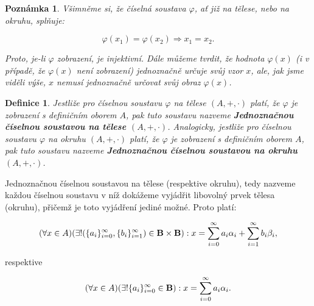 \documentclass[12pt]{book}
\newtheorem{definice}{Definice}
\newtheorem{pozn}{Poznámka}
\begin{document}
\begin{pozn}
	Všimněme si, že číselná soustava $\varphi$, ať již na tělese, nebo na okruhu, splňuje:
	
	$$\varphi (x_1) = \varphi(x_2) \Rightarrow x_1 = x_2.$$
	
	Proto, je-li $\varphi$ zobrazení, je injektivní.
	Dále můžeme tvrdit, že hodnota $\varphi(x)$ (i v případě, že $\varphi(x)$ není zobrazení) jednoznačně určuje svůj vzor $x$, ale, jak jsme viděli výše, $x$ nemusí jednoznačně určovat svůj obraz $\varphi(x)$.
	
\end{pozn}

\begin{definice}
	Jestliže pro číselnou soustavu $\varphi$ na tělese $(A,+,\cdot)$ platí, že $\varphi$ je zobrazení s definičním oborem $A$, pak tuto soustavu nazveme \textbf{Jednoznačnou číselnou soustavou na tělese $(A,+,\cdot)$}. Analogicky, jestliže pro číselnou soustavu $\varphi$ na okruhu $(A,+,\cdot)$ platí, že $\varphi$ je zobrazení s definičním oborem $A$, pak tuto soustavu nazveme \textbf{Jednoznačnou číselnou soustavou na okruhu $(A,+,\cdot)$}.
\end{definice}

Jednoznačnou číselnou soustavou na tělese (respektive okruhu), tedy nazveme každou číselnou soustavu v níž dokážeme vyjádřit libovolný prvek tělesa (okruhu), přičemž je toto vyjádření jediné možné. Proto platí:	

$$(\forall x \in A) (\exists!(\{a_i\}_{i=0}^{\infty},\{b_i\}_{i=1}^{\infty})\in\textbf{B}\times\textbf{B}): x = \sum_{i=0}^{\infty} a_{i}\alpha_{i} + \sum_{i=1}^{\infty} b_{i}\beta_{i},$$

respektive

$$(\forall x \in A) (\exists! \{a_i\}_{i=0}^{\infty} \in \textbf{B}): x = \sum_{i=0}^{\infty} a_{i}\alpha_{i}.$$
\end{document}
